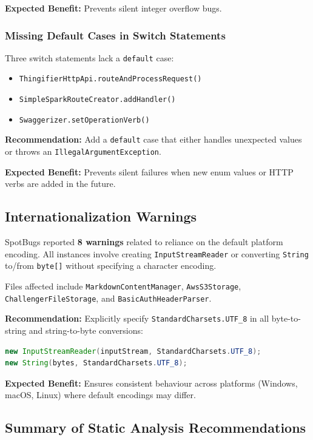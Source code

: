 \documentclass[11pt,a4paper]{article}
\begin{document}
\noindent\textbf{Expected Benefit:} Prevents silent integer overflow bugs.

\subsubsection{Missing Default Cases in Switch Statements}

Three switch statements lack a \texttt{default} case:
\begin{itemize}
    \item \texttt{ThingifierHttpApi.routeAndProcessRequest()}
    \item \texttt{SimpleSparkRouteCreator.addHandler()}
    \item \texttt{Swaggerizer.setOperationVerb()}
\end{itemize}

\noindent\textbf{Recommendation:} Add a \texttt{default} case that either handles unexpected values or throws an \texttt{IllegalArgumentException}.

\noindent\textbf{Expected Benefit:} Prevents silent failures when new enum values or HTTP verbs are added in the future.

\subsection{Internationalization Warnings}

SpotBugs reported \textbf{8 warnings} related to reliance on the default platform encoding. All instances involve creating \texttt{InputStreamReader} or converting \texttt{String} to/from \texttt{byte[]} without specifying a character encoding.

\noindent Files affected include \texttt{MarkdownContentManager}, \texttt{AwsS3Storage}, \texttt{ChallengerFileStorage}, and \texttt{BasicAuthHeaderParser}.

\noindent\textbf{Recommendation:} Explicitly specify \texttt{StandardCharsets.UTF\_8} in all byte-to-string and string-to-byte conversions:
\begin{lstlisting}[language=Java]
new InputStreamReader(inputStream, StandardCharsets.UTF_8);
new String(bytes, StandardCharsets.UTF_8);
\end{lstlisting}

\noindent\textbf{Expected Benefit:} Ensures consistent behaviour across platforms (Windows, macOS, Linux) where default encodings may differ.

\subsection{Summary of Static Analysis Recommendations}
\end{document}
